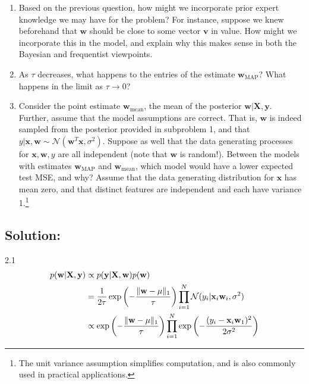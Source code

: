 \documentclass[submit]{harvardml}
\begin{document}
\begin{problem}
\begin{enumerate}
        \item Based on the previous question, how might we incorporate prior expert knowledge we may have for the problem? For instance, suppose we knew beforehand that $\mathbf{w}$ should be close to some vector $\mathbf{v}$ in value. How might we incorporate this in the model, and explain why this makes sense in both the Bayesian and frequentist viewpoints.
        
        \item As $\tau$ decreases, what happens to the entries of the estimate $\mathbf{w}_{\mathrm{MAP}}$? What happens in the limit as $\tau \to 0$?
        
        \item Consider the point estimate $\mathbf{w}_{\mathrm{mean}}$, the mean of the posterior $\mathbf{w}|\mathbf{X},\mathbf{y}$. Further, assume that the model assumptions are correct. That is, $\mathbf{w}$ is indeed sampled from the posterior provided in subproblem 1, and that $y|\mathbf{x},\mathbf{w}\sim\mathcal{N}(\mathbf{w}^T\mathbf{x},\sigma^2)$. Suppose as well that the data generating processes for $\mathbf{x},\mathbf{w},y$ are all independent (note that $\mathbf{w}$ is random!). Between the models with estimates $\mathbf{w}_{\mathrm{MAP}}$ and $\mathbf{w}_{\mathrm{mean}}$, which model would have a lower expected test MSE, and why? Assume that the data generating distribution for $\mathbf{x}$ has mean zero, and that distinct features are independent and each have variance 1.\footnote{The unit variance assumption simplifies computation, and is also commonly used in practical applications.}
        
    \end{enumerate}
  
  
\end{problem}

\subsection*{Solution:}
2.1 \begin{align*}
    p(\mathbf{w}|\mathbf{X}, \mathbf{y}) &\propto  p(\mathbf{y}|\mathbf{X},\mathbf{w}) p(\mathbf{w})\\
    &= \frac{1}{2\tau}\exp\left(-\frac{\|\mathbf{w}-\mathbf{\mu}\|_1}{\tau}\right) \prod_{i=1}^N \mathcal{N}(y_i|\bold{x}_i\bold{w}_i, \sigma^2) \\
    &\propto \exp\left(-\frac{\|\mathbf{w}-\mathbf{\mu}\|_1}{\tau}\right) \prod_{i=1}^N \exp \left(-\frac{(y_i - \bold{x}_i \bold{w}_1)^2}{2\sigma^2} \right)
\end{align*}
\end{document}
